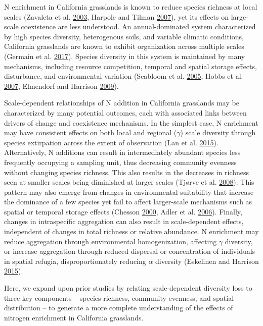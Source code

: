 \documentclass[twoside,12pt,final]{ucthesis-CA2012}
\begin{document}
\begin{ucmainmatter}
N enrichment in California grasslands is known to reduce species richness at local scales (Zavaleta et al. \protect\hyperlink{ref-Zavaleta2003}{2003}, Harpole and Tilman \protect\hyperlink{ref-Harpole2007}{2007}), yet its effects on large-scale coexistence are less understood. An annual-dominated system characterized by high species diversity, heterogenous soils, and variable climatic conditions, California grasslands are known to exhibit organization across multiple scales (Germain et al. \protect\hyperlink{ref-germain2017}{2017}). Species diversity in this system is maintained by many mechanisms, including resource competition, temporal and spatial storage effects, disturbance, and environmental variation (Seabloom et al. \protect\hyperlink{ref-seabloom2005}{2005}, Hobbs et al. \protect\hyperlink{ref-Hobbs2007}{2007}, Elmendorf and Harrison \protect\hyperlink{ref-elmendorf2009}{2009}).

Scale-dependent relationships of N addition in California grasslands may be characterized by many potential outcomes, each with associated links between drivers of change and coexistence mechanisms. In the simplest case, N enrichment may have consistent effects on both local and regional (\(\gamma\)) scale diversity through species extirpation across the extent of observation (Lan et al. \protect\hyperlink{ref-lan2015}{2015}). Alternatively, N additions can result in intermediately abundant species less frequently occupying a sampling unit, thus decreasing community evenness without changing species richness. This also results in the decreases in richness seen at smaller scales being diminished at larger scales (Tjørve et al. \protect\hyperlink{ref-tj2008}{2008}). This pattern may also emerge from changes in environmental suitability that increase the dominance of a few species yet fail to affect larger-scale mechanisms such as spatial or temporal storage effects (Chesson \protect\hyperlink{ref-Chesson2000}{2000}, Adler et al. \protect\hyperlink{ref-Adler2006}{2006}). Finally, changes in intraspecific aggregation can also result in scale-dependent effects, independent of changes in total richness or relative abundance. N enrichment may reduce aggregation through environmental homogenization, affecting \(\gamma\) diversity, or increase aggregation through reduced dispersal or concentration of individuals in spatial refugia, disproportionately reducing \(\alpha\) diversity (Eskelinen and Harrison \protect\hyperlink{ref-eskelinen2015}{2015}).

Here, we expand upon prior studies by relating scale-dependent diversity loss to three key components -- species richness, community evenness, and spatial distribution -- to generate a more complete understanding of the effects of nitrogen enrichment in California grasslands.


\end{ucmainmatter}
\end{document}

